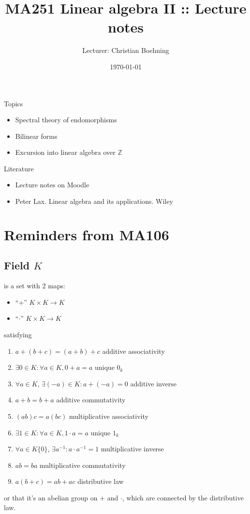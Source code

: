 \documentclass[a4paper]{article}
\title{MA251 Linear algebra II :: Lecture notes}
\author{Lecturer: Christian Boehning}
\date{\today}
\theoremstyle{definition}
\begin{document}
\maketitle
\thispagestyle{empty}

\tableofcontents
\thispagestyle{empty}
\newpage
\setcounter{page}{1}

Topics
\begin{itemize}
	\item Spectral theory of endomorphisms
	\item Bilinear forms
	\item Excursion into linear algebra over $\mathbb Z$ 
\end{itemize}
Literature

\begin{itemize}
	\item Lecture notes on Moodle
	\item Peter Lax. Linear algebra and its applications. Wiley
\end{itemize}

\section{Reminders from MA106}
\subsection{Field $K$} 
is a set with 2 maps:
\begin{itemize}
	\item ``+'' $K \times K \rightarrow K$
	\item ``$\cdot$'' $K \times K \rightarrow K$
\end{itemize} satisfying

\begin{enumerate}
	\item $a+(b+c)=(a+b)+c$ \qquad additive associativity
	\item $\exists 0 \in K : \forall a \in K, 0+a=a$ \qquad unique $0_k$
	\item $\forall a \in K$, $\exists (-a) \in K : a+(-a)=0$ \qquad additive inverse
	\item $a+b=b+a$ \qquad additive commutativity
	\item $(ab)c=a(bc)$ \qquad multiplicative associativity
	\item $\exists 1 \in K : \forall a \in K, 1 \cdot a =a$ \qquad unique $1_k$ \quad [$0_k \neq 1_k$]
	\item $\forall a \in K \{0\}$, $\exists a^{-1} : a \cdot a^{-1}=1$ \qquad multiplicative inverse
	\item $ab=ba$ \qquad multiplicative commutativity
	\item $a(b+c)=ab+ac$ \qquad distributive law
\end{enumerate}
or that it's an abelian group on $+$ and $\cdot$, which are connected by the distributive law.
\end{document}
